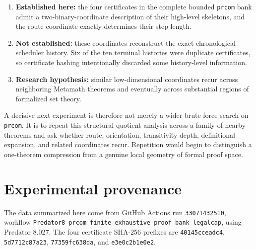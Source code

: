 \documentclass[11pt]{article}
\newcommand{\prcom}{\texttt{prcom}}
\begin{document}
\begin{enumerate}[leftmargin=2em]
\item \textbf{Established here:} the four certificates in the complete bounded
\prcom{} bank admit a two-binary-coordinate description of their high-level
skeletons, and the route coordinate exactly determines their step length.

\item \textbf{Not established:} these coordinates reconstruct the exact
chronological scheduler history. Six of the ten terminal histories were duplicate
certificates, so certificate hashing intentionally discarded some history-level
information.

\item \textbf{Research hypothesis:} similar low-dimensional coordinates recur
across neighboring Metamath theorems and eventually across substantial regions
of formalized set theory.
\end{enumerate}

A decisive next experiment is therefore not merely a wider brute-force search on
\prcom{}. It is to repeat this structural quotient analysis across a family of
nearby theorems and ask whether route, orientation, transitivity depth,
definitional expansion, and related coordinates recur. Repetition would begin
to distinguish a one-theorem compression from a genuine local geometry of formal
proof space.

\section*{Experimental provenance}
The data summarized here come from GitHub Actions run \texttt{33071432510},
workflow \texttt{Predator8 prcom finite exhaustive proof bank legalcap}, using
Predator 8.027. The four certificate SHA-256 prefixes are
\texttt{40145cceadc4}, \texttt{5d7712c87a23}, \texttt{77359fc638da}, and
\texttt{e3e0c2b1e0e2}.
\end{document}
